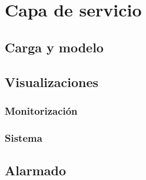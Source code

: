 \chapter{Capa de servicio}


\section{Carga y modelo}


\section{Visualizaciones}

\subsection{Monitorización}
\subsection{Sistema}

\section{Alarmado}


